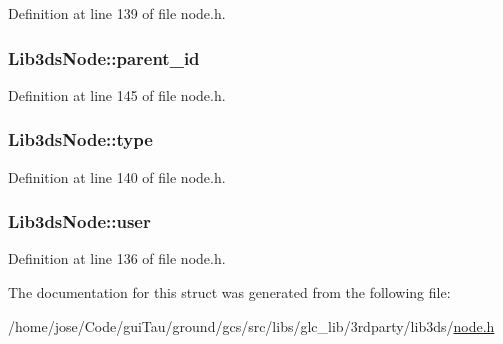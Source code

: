 Definition at line 139 of file node.\-h.

\hypertarget{struct_lib3ds_node_a07f69d490ceedc84793833200f83e344}{
\subsubsection[{parent\-\_\-id}]{ Lib3ds\-Node\-::parent\-\_\-id}}\label{struct_lib3ds_node_a07f69d490ceedc84793833200f83e344}


Definition at line 145 of file node.\-h.

\hypertarget{struct_lib3ds_node_a08e62ff21290f9685c50ad09497fbc7f}{
\subsubsection[{type}]{ Lib3ds\-Node\-::type}}\label{struct_lib3ds_node_a08e62ff21290f9685c50ad09497fbc7f}


Definition at line 140 of file node.\-h.

\hypertarget{struct_lib3ds_node_a8aa11fb2b2529249bff64354311fafdd}{
\subsubsection[{user}]{ Lib3ds\-Node\-::user}}\label{struct_lib3ds_node_a8aa11fb2b2529249bff64354311fafdd}


Definition at line 136 of file node.\-h.



The documentation for this struct was generated from the following file\-:\begin{DoxyCompactItemize}
\item 
/home/jose/\-Code/gui\-Tau/ground/gcs/src/libs/glc\-\_\-lib/3rdparty/lib3ds/\hyperlink{node_8h}{node.\-h}\end{DoxyCompactItemize}
